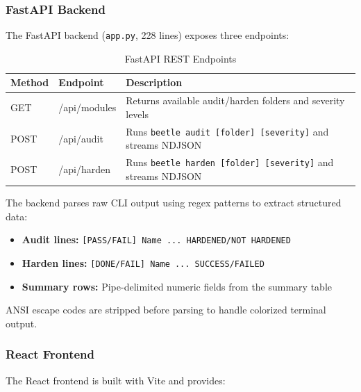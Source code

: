 \subsubsection{FastAPI Backend}

The FastAPI backend (\texttt{app.py}, 228 lines) exposes three endpoints:

\begin{table}[H]
\centering
\caption{FastAPI REST Endpoints}
\begin{tabular}{|l|l|p{6cm}|}
\hline
\textbf{Method} & \textbf{Endpoint} & \textbf{Description} \\
\hline
GET & /api/modules & Returns available audit/harden folders and severity levels \\
\hline
POST & /api/audit & Runs \texttt{beetle audit [folder] [severity]} and streams NDJSON \\
\hline
POST & /api/harden & Runs \texttt{beetle harden [folder] [severity]} and streams NDJSON \\
\hline
\end{tabular}
\label{tab:endpoints}
\end{table}

The backend parses raw CLI output using regex patterns to extract structured data:
\begin{itemize}[noitemsep]
    \item \textbf{Audit lines:} \texttt{[PASS/FAIL] Name ... HARDENED/NOT HARDENED}
    \item \textbf{Harden lines:} \texttt{[DONE/FAIL] Name ... SUCCESS/FAILED}
    \item \textbf{Summary rows:} Pipe-delimited numeric fields from the summary table
\end{itemize}

ANSI escape codes are stripped before parsing to handle colorized terminal output.

\subsubsection{React Frontend}

The React frontend is built with Vite and provides:

